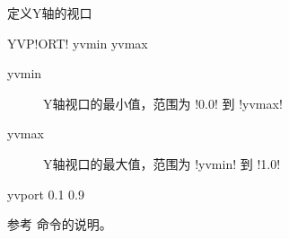 \label{cmd:yvport}

定义Y轴的视口

\begin{SACSTX}
YVP!ORT! yvmin yvmax
\end{SACSTX}

\begin{description}
\item [yvmin] Y轴视口的最小值，范围为 !0.0! 到 !yvmax!
\item [yvmax] Y轴视口的最大值，范围为 !yvmin! 到 !1.0!
\end{description}

\begin{SACDFT}
yvport 0.1 0.9
\end{SACDFT}

参考  命令的说明。
